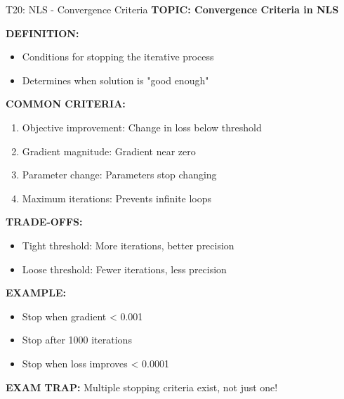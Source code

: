 \documentclass[8pt]{beamer}
\begin{document}
	\begin{frame}{T20: NLS - Convergence Criteria}
		\fontsize{6.5}{7.5}\selectfont
		\textbf{TOPIC: Convergence Criteria in NLS}
		
		\vspace{0.1cm}
		\textbf{DEFINITION:}
		\begin{itemize}
			\item Conditions for stopping the iterative process
			\item Determines when solution is "good enough"
		\end{itemize}
		
		\vspace{0.1cm}
		\textbf{COMMON CRITERIA:}
		\begin{enumerate}
			\item \textcolor{myblue}{Objective improvement:} Change in loss below threshold
			\item \textcolor{myblue}{Gradient magnitude:} Gradient near zero
			\item \textcolor{myblue}{Parameter change:} Parameters stop changing
			\item \textcolor{myblue}{Maximum iterations:} Prevents infinite loops
		\end{enumerate}
		
		\vspace{0.1cm}
		\textbf{TRADE-OFFS:}
		\begin{itemize}
			\item Tight threshold: More iterations, better precision
			\item Loose threshold: Fewer iterations, less precision
		\end{itemize}
		
		\vspace{0.1cm}
		\textbf{EXAMPLE:}
		\begin{itemize}
			\item Stop when gradient < 0.001
			\item Stop after 1000 iterations			\item Stop when loss improves < 0.0001
		\end{itemize}
		
		\textcolor{myred}{\textbf{EXAM TRAP:}} Multiple stopping criteria exist, not just one!
	\end{frame}
	
	
\end{document}
